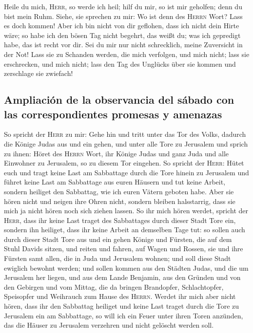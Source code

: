  Heile du mich, \textsc{Herr}, so werde ich heil; hilf du
mir, so ist mir geholfen; denn du bist mein Ruhm.  Siehe,
sie sprechen zu mir: Wo ist denn des \textsc{Herrn} Wort? Lass es doch
kommen!  Aber ich bin nicht von dir geflohen, dass ich
nicht dein Hirte wäre; so habe ich den bösen Tag nicht begehrt, das
weißt du; was ich gepredigt habe, das ist recht vor dir. 
Sei du mir nur nicht schrecklich, meine Zuversicht in der Not!
 Lass sie zu Schanden werden, die mich verfolgen, und
mich nicht; lass sie erschrecken, und mich nicht; lass den Tag des
Unglücks über sie kommen und zerschlage sie zwiefach!

\hypertarget{ampliaciuxf3n-de-la-observancia-del-suxe1bado-con-las-correspondientes-promesas-y-amenazas}{%
\subsection{Ampliación de la observancia del sábado con las
correspondientes promesas y
amenazas}\label{ampliaciuxf3n-de-la-observancia-del-suxe1bado-con-las-correspondientes-promesas-y-amenazas}}

 So spricht der \textsc{Herr} zu mir: Gehe hin und tritt
unter das Tor des Volks, dadurch die Könige Judas aus und ein gehen, und
unter alle Tore zu Jerusalem  und sprich zu ihnen: Höret
des \textsc{Herrn} Wort, ihr Könige Judas und ganz Juda und alle
Einwohner zu Jerusalem, so zu diesem Tor eingehen.  So
spricht der \textsc{Herr}: Hütet euch und tragt keine Last am Sabbattage
durch die Tore hinein zu Jerusalem  und führet keine Last
am Sabbattage aus euren Häusern und tut keine Arbeit, sondern heiliget
den Sabbattag, wie ich euren Vätern geboten habe.  Aber
sie hören nicht und neigen ihre Ohren nicht, sondern bleiben
halsstarrig, dass sie mich ja nicht hören noch sich ziehen lassen.
 So ihr mich hören werdet, spricht der \textsc{Herr},
dass ihr keine Last traget des Sabbattages durch dieser Stadt Tore ein,
sondern ihn heiliget, dass ihr keine Arbeit an demselben Tage tut:
 so sollen auch durch dieser Stadt Tore aus und ein gehen
Könige und Fürsten, die auf dem Stuhl Davids sitzen, und reiten und
fahren, auf Wagen und Rossen, sie und ihre Fürsten samt allen, die in
Juda und Jerusalem wohnen; und soll diese Stadt ewiglich bewohnt werden;
 und sollen kommen aus den Städten Judas, und die um
Jerusalem her liegen, und aus dem Lande Benjamin, aus den Gründen und
von den Gebirgen und vom Mittag, die da bringen Brandopfer,
Schlachtopfer, Speisopfer und Weihrauch zum Hause des \textsc{Herrn}.
 Werdet ihr mich aber nicht hören, dass ihr den Sabbattag
heiliget und keine Last traget durch die Tore zu Jerusalem ein am
Sabbattage, so will ich ein Feuer unter ihren Toren anzünden, das die
Häuser zu Jerusalem verzehren und nicht gelöscht werden soll.

